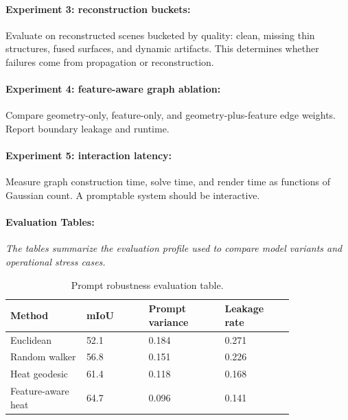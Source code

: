 \documentclass{article}
\begin{document}
\paragraph{Experiment 3: reconstruction buckets:}

Evaluate on reconstructed scenes bucketed by quality: clean, missing thin structures, fused surfaces, and dynamic artifacts. This determines whether failures come from propagation or reconstruction.

\paragraph{Experiment 4: feature-aware graph ablation:}

Compare geometry-only, feature-only, and geometry-plus-feature edge weights. Report boundary leakage and runtime.

\paragraph{Experiment 5: interaction latency:}

Measure graph construction time, solve time, and render time as functions of Gaussian count. A promptable system should be interactive.

\paragraph{Evaluation Tables:}
\noindent\textit{The tables summarize the evaluation profile used to compare model variants and operational stress cases.}

\begin{table}[t]
\centering
\caption{Prompt robustness evaluation table.}
\begin{tabular}{@{}p{0.22\linewidth}p{0.18\linewidth}p{0.22\linewidth}p{0.20\linewidth}@{}}
\toprule
\textbf{Method} & \textbf{mIoU} & \textbf{Prompt variance} & \textbf{Leakage rate}\\
\midrule
Euclidean & 52.1 & 0.184 & 0.271\\
Random walker & 56.8 & 0.151 & 0.226\\
Heat geodesic & 61.4 & 0.118 & 0.168\\
Feature-aware heat & 64.7 & 0.096 & 0.141\\
\bottomrule
\end{tabular}
\end{table}
\end{document}
